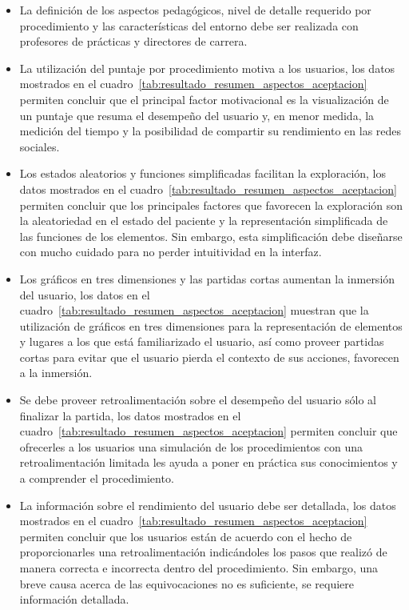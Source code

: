 \begin{itemize}


\item La definición de los aspectos pedagógicos, nivel de detalle requerido por
    procedimiento y las características del entorno debe ser realizada con
    profesores de prácticas y directores de carrera.

\item La utilización del puntaje por procedimiento motiva a los usuarios, los
    datos mostrados en el cuadro~\ref{tab:resultado_resumen_aspectos_aceptacion}
    permiten concluir que el principal factor motivacional es la visualización
    de un puntaje que resuma el desempeño del usuario y, en menor medida, la
    medición del tiempo y la posibilidad de compartir su rendimiento en las
    redes sociales. 

\item Los estados aleatorios y funciones simplificadas facilitan la exploración,
    los datos mostrados en el
    cuadro~\ref{tab:resultado_resumen_aspectos_aceptacion} permiten concluir que
    los principales factores que favorecen la exploración son la aleatoriedad en
    el estado del paciente y la representación simplificada de las funciones de
    los elementos. Sin embargo, esta simplificación debe diseñarse con mucho
    cuidado para no perder intuitividad en la interfaz. 


\item Los gráficos en tres dimensiones y las partidas cortas aumentan la
    inmersión del usuario, los datos en el
    cuadro~\ref{tab:resultado_resumen_aspectos_aceptacion} muestran que la
    utilización de gráficos en tres dimensiones para la representación de
    elementos y lugares a los que está familiarizado el usuario, así como
    proveer partidas cortas para evitar que el usuario pierda el contexto de sus
    acciones, favorecen a la inmersión. 

\item Se debe proveer retroalimentación sobre el desempeño del usuario sólo al
    finalizar la partida, los datos mostrados en el
    cuadro~\ref{tab:resultado_resumen_aspectos_aceptacion} permiten concluir que
    ofrecerles a los usuarios una simulación de los procedimientos con una
    retroalimentación limitada les ayuda a poner en práctica sus conocimientos y
    a comprender el procedimiento. 

\item La información sobre el rendimiento del usuario debe ser detallada, los
    datos mostrados en el cuadro~\ref{tab:resultado_resumen_aspectos_aceptacion}
    permiten concluir que los usuarios están de acuerdo con el hecho de
    proporcionarles una retroalimentación indicándoles los pasos que realizó de
    manera correcta e incorrecta dentro del procedimiento. Sin embargo, una
    breve causa acerca de las equivocaciones no es suficiente, se requiere
    información detallada. 
    

\end{itemize}
